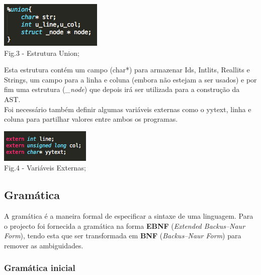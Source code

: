 \documentclass[12pt]{article}
\begin{document}
\begin{center}
\includegraphics[scale=1]{union_struct.png}\\
Fig.3 - Estrutura Union;
\end{center}

\indent Esta estrutura contém um campo (char*) para armazenar Id\textquotesingle s, Intlit\textquotesingle s, Reallit\textquotesingle s e String\textquotesingle s, um campo para a linha e coluna (embora não estejam a ser usados) e por fim uma estrutura (\textit{\_node}) que depois irá ser utilizada para a construção da AST. \\
\indent Foi necessário também definir algumas variáveis externas como o yytext, linha e coluna para partilhar valores entre ambos os programas.

\begin{center}
\includegraphics[scale=1]{extern_vars.png}\\
Fig.4 - Variáveis Externas;
\end{center}

\newpage


\subsection{Gramática}

\indent A gramática é a maneira formal de especificar a sintaxe de uma linguagem. Para o projecto foi fornecida a gramática na forma \textbf{EBNF} (\textit{Extended Backus–Naur Form}), tendo esta que ser transformada em \textbf{BNF} (\textit{Backus–Naur Form}) para remover as ambiguidades.

\subsubsection{Gramática inicial}
\end{document}
